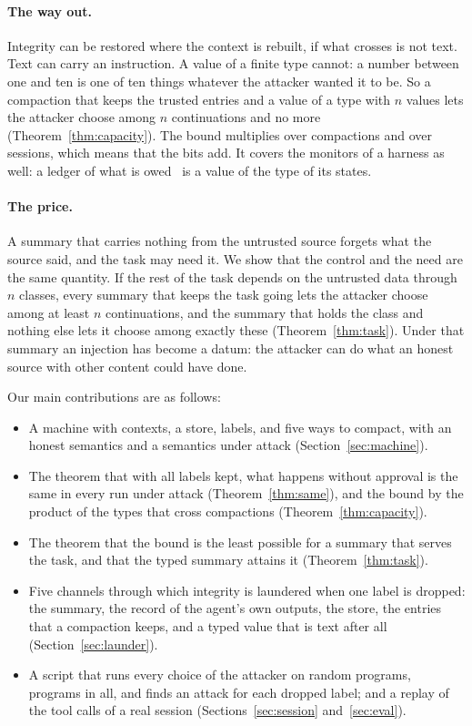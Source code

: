 \documentclass[acmsmall,nonacm,screen]{acmart}
\begin{document}
\paragraph{The way out.} Integrity can be restored where the context is rebuilt, if what
crosses is not text. Text can carry an instruction. A value of a finite type cannot: a number
between one and ten is one of ten things whatever the attacker wanted it to be. So a
compaction that keeps the trusted entries and a value of a type with $n$ values lets the
attacker choose among $n$ continuations and no more (Theorem~\ref{thm:capacity}). The bound
multiplies over compactions and over sessions, which means that the bits add. It covers the
monitors of a harness as well: a ledger of what is owed~\cite{tpp12} is a value of the type
of its states.

\paragraph{The price.} A summary that carries nothing from the untrusted source forgets what
the source said, and the task may need it. We show that the control and the need are the
same quantity. If the rest of the task depends on the untrusted data through $n$ classes,
every summary that keeps the task going lets the attacker choose among at least $n$
continuations, and the summary that holds the class and nothing else lets it choose among
exactly these (Theorem~\ref{thm:task}). Under that summary an injection has become a datum:
the attacker can do what an honest source with other content could have done.

Our main contributions are as follows:
\begin{itemize}
\item A machine with contexts, a store, labels, and five ways to compact, with an honest
  semantics and a semantics under attack (Section~\ref{sec:machine}).
\item The theorem that with all labels kept, what happens without approval is the same in
  every run under attack (Theorem~\ref{thm:same}), and the bound by the product of the types
  that cross compactions (Theorem~\ref{thm:capacity}).
\item The theorem that the bound is the least possible for a summary that serves the task,
  and that the typed summary attains it (Theorem~\ref{thm:task}).
\item Five channels through which integrity is laundered when one label is dropped: the
  summary, the record of the agent's own outputs, the store, the entries that a compaction
  keeps, and a typed value that is text after all (Section~\ref{sec:launder}).
\item A script that runs every choice of the attacker on random programs, \exProgramsAll{}
  programs in all, and finds an attack for each dropped label; and a replay of the tool calls
  of a real session (Sections~\ref{sec:session} and~\ref{sec:eval}).
\end{itemize}
\end{document}
